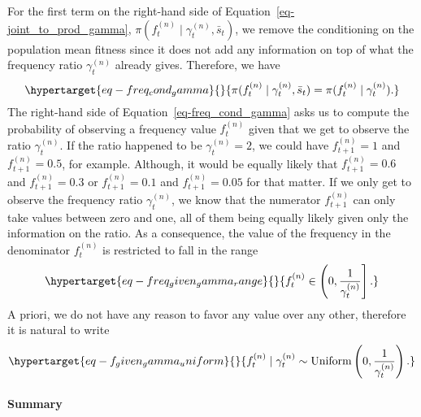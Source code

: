 \documentclass[
  letterpaper,
  DIV=11,
  numbers=noendperiod]{scrartcl}
\let\oldparagraph\paragraph
\renewcommand{\paragraph}[1]{\oldparagraph{#1}\mbox{}}
\begin{document}
\begin{refsegment}
For the first term on the right-hand side of
Equation~\ref{eq-joint_to_prod_gamma},
\(\pi(f_t^{(n)} \mid \gamma_{t}^{(n)}, \bar{s}_t)\), we remove the
conditioning on the population mean fitness since it does not add any
information on top of what the frequency ratio \(\gamma_t^{(n)}\)
already gives. Therefore, we have
\begin{equation}\protect\hypertarget{eq-freq_cond_gamma}{}{
\pi(f_t^{(n)} \mid \gamma_{t}^{(n)}, \bar{s}_t) =
\pi(f_t^{(n)} \mid \gamma_{t}^{(n)}).
}\label{eq-freq_cond_gamma}\end{equation} The right-hand side of
Equation~\ref{eq-freq_cond_gamma} asks us to compute the probability of
observing a frequency value \(f_t^{(n)}\) given that we get to observe
the ratio \(\gamma_{t}^{(n)}\). If the ratio happened to be
\(\gamma_{t}^{(n)} = 2\), we could have \(f_{t+1}^{(n)} = 1\) and
\(f_{t+1}^{(n)} = 0.5\), for example. Although, it would be equally
likely that \(f_{t+1}^{(n)} = 0.6\) and \(f_{t+1}^{(n)} = 0.3\) or
\(f_{t+1}^{(n)} = 0.1\) and \(f_{t+1}^{(n)} = 0.05\) for that matter. If
we only get to observe the frequency ratio \(\gamma_t^{(n)}\), we know
that the numerator \(f_{t+1}^{(n)}\) can only take values between zero
and one, all of them being equally likely given only the information on
the ratio. As a consequence, the value of the frequency in the
denominator \(f_{t}^{(n)}\) is restricted to fall in the range
\begin{equation}\protect\hypertarget{eq-freq_given_gamma_range}{}{
f_{t}^{(n)} \in \left(0, \frac{1}{\gamma_t^{(n)}} \right].
}\label{eq-freq_given_gamma_range}\end{equation} A priori, we do not
have any reason to favor any value over any other, therefore it is
natural to write
\begin{equation}\protect\hypertarget{eq-f_given_gamma_uniform}{}{
f_t^{(n)} \mid \gamma_t^{(n)} \sim 
\operatorname{Uniform}\left( 0, \frac{1}{\gamma_t^{(n)}} \right).
}\label{eq-f_given_gamma_uniform}\end{equation}

\hypertarget{summary-1}{%
\paragraph{Summary}\label{summary-1}}


\end{refsegment}
\end{document}
